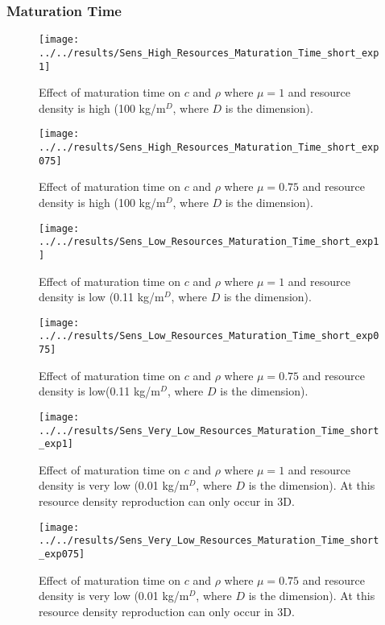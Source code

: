 \begin{refsection}
\subsubsection{Maturation Time}
\begin{figure}[H]
	\centering
	\texttt{[image: ../../results/Sens\_High\_Resources\_Maturation\_Time\_short\_exp1]}
	\caption{Effect of maturation time on $c$ and $\rho$ where $\mu = 1$ and resource density is high (100 kg/m$^D$, where $D$ is the dimension).}
	\label{fig:senshighresourcesmaturationtimeshortexp1}
\end{figure}
\begin{figure}[h]
	\centering
	\texttt{[image: ../../results/Sens\_High\_Resources\_Maturation\_Time\_short\_exp075]}
	\caption{Effect of maturation time on $c$ and $\rho$ where $\mu = 0.75$ and resource density is high (100 kg/m$^D$, where $D$ is the dimension).}
	\label{fig:sensmaturationtimeshortexp075}
\end{figure}
\begin{figure}[h]
	\centering
	\texttt{[image: ../../results/Sens\_Low\_Resources\_Maturation\_Time\_short\_exp1]}
	\caption{Effect of maturation time on $c$ and $\rho$ where $\mu = 1$ and resource density is low (0.11 kg/m$^D$, where $D$ is the dimension).}
	\label{fig:senslowresourcesmaturationtimeshortexp1}
\end{figure}
\begin{figure}[h]
	\centering
	\texttt{[image: ../../results/Sens\_Low\_Resources\_Maturation\_Time\_short\_exp075]}
	\caption{Effect of maturation time on $c$ and $\rho$ where $\mu = 0.75$ and resource density is low(0.11 kg/m$^D$, where $D$ is the dimension).}
	\label{fig:senslowresourcesmaturationtimeshortexp075}
\end{figure}
\begin{figure}[h]
	\centering
	\texttt{[image: ../../results/Sens\_Very\_Low\_Resources\_Maturation\_Time\_short\_exp1]}
	\caption{Effect of maturation time on $c$ and $\rho$ where $\mu = 1$ and resource density is very low (0.01 kg/m$^D$, where $D$ is the dimension).  At this resource density reproduction can only occur in 3D.}
	\label{fig:sensverylowresourcesmaturationtimeshortexp1}
\end{figure}
\begin{figure}[h]
	\centering
	\texttt{[image: ../../results/Sens\_Very\_Low\_Resources\_Maturation\_Time\_short\_exp075]}
	\caption{Effect of maturation time on $c$ and $\rho$ where $\mu = 0.75$ and resource density is very low (0.01 kg/m$^D$, where $D$ is the dimension).  At this resource density reproduction can only occur in 3D.}
	\label{fig:sensverylowresourcesmaturationtimeshortexp075}
\end{figure}





\end{refsection}
